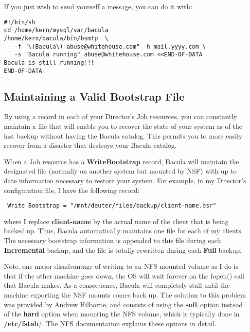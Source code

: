 If you just wish to send yourself a message, you can do it with: 

\footnotesize
\begin{verbatim}
#!/bin/sh
cd /home/kern/mysql/var/bacula
/home/kern/bacula/bin/bsmtp  \
   -f "\(Bacula\) abuse@whitehouse.com" -h mail.yyyy.com \
   -s "Bacula running" abuse@whitehouse.com <<END-OF-DATA
Bacula is still running!!!
END-OF-DATA
\end{verbatim}
\normalsize

\subsection*{Maintaining a Valid Bootstrap File}
\label{bootstrap}

By using a 
 record in each of your
Director's Job resources, you can constantly maintain a 
\ilink{bootstrap}{_ChapterStart43} file that will enable you to
recover the state of your system as of the last backup without having the
Bacula catalog. This permits you to more easily recover from a disaster that
destroys your Bacula catalog. 

When a Job resource has a {\bf WriteBootstrap} record, Bacula will maintain
the designated file (normally on another system but mounted by NSF) with up to
date information necessary to restore your system. For example, in my
Director's configuration file, I have the following record: 

\footnotesize
\begin{verbatim}
 Write Bootstrap = "/mnt/deuter/files/backup/client-name.bsr"
\end{verbatim}
\normalsize

where I replace {\bf client-name} by the actual name of the client that is
being backed up. Thus, Bacula automatically maintains one file for each of my
clients. The necessary bootstrap information is appended to this file during
each {\bf Incremental} backup, and the file is totally rewritten during each
{\bf Full} backup. 

Note, one major disadvantage of writing to an NFS mounted volume as I do is
that if the other machine goes down, the OS will wait forever on the fopen()
call that Bacula makes. As a consequence, Bacula will completely stall until
the machine exporting the NSF mounts comes back up. The solution to this
problem was provided by Andrew Hilborne, and consists of using the {\bf soft}
option instead of the {\bf hard} option when mounting the NFS volume, which is
typically done in {\bf /etc/fstab}/. The NFS documentation explains these
options in detail. 

